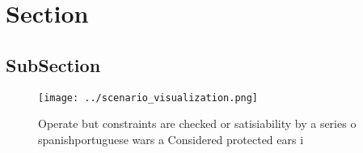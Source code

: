 \documentclass[a4paper]{article}
\begin{document}
\section{Section}

\subsection{SubSection}

\begin{figure}
\centering
\texttt{[image: ../scenario\_visualization.png]}
\caption{Operate but constraints are checked or satisiability by a series o spanishportuguese wars a Considered protected ears i
}
\end{figure}
 
\end{document}
